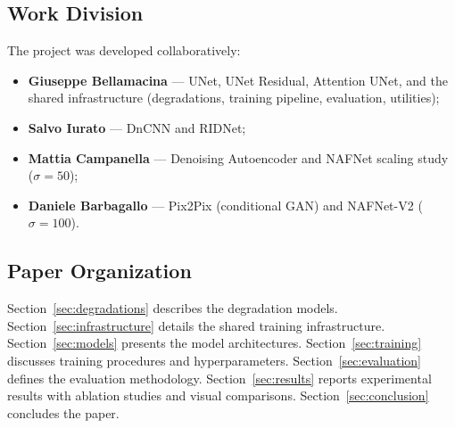 \subsection{Work Division}

The project was developed collaboratively:
\begin{itemize}
    \item \textbf{Giuseppe Bellamacina} --- UNet, UNet Residual, Attention UNet, and the shared infrastructure (degradations, training pipeline, evaluation, utilities);
    \item \textbf{Salvo Iurato} --- DnCNN and RIDNet;
    \item \textbf{Mattia Campanella} --- Denoising Autoencoder and NAFNet scaling study ($\sigma\!=\!50$);
    \item \textbf{Daniele Barbagallo} --- Pix2Pix (conditional GAN) and NAFNet-V2 ($\sigma\!=\!100$).
\end{itemize}

\subsection{Paper Organization}

Section~\ref{sec:degradations} describes the degradation models. Section~\ref{sec:infrastructure} details the shared training infrastructure. Section~\ref{sec:models} presents the model architectures. Section~\ref{sec:training} discusses training procedures and hyperparameters. Section~\ref{sec:evaluation} defines the evaluation methodology. Section~\ref{sec:results} reports experimental results with ablation studies and visual comparisons. Section~\ref{sec:conclusion} concludes the paper.
